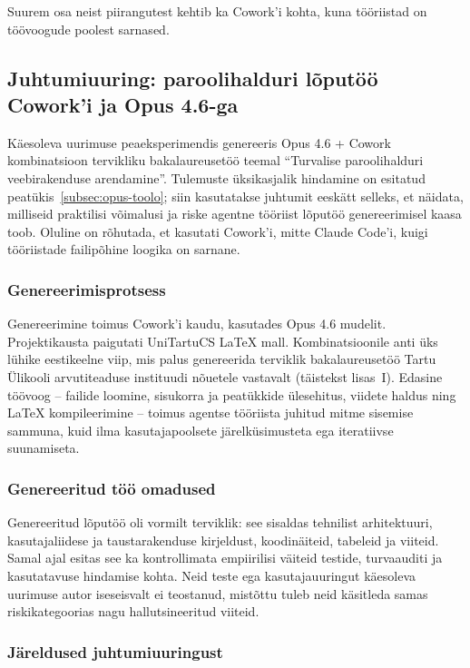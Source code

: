 Suurem osa neist piirangutest kehtib ka Cowork'i kohta, kuna tööriistad on töövoogude poolest sarnased.

\subsection{Juhtumiuuring: paroolihalduri lõputöö Cowork'i ja Opus 4.6-ga} \label{subsec:cowork-juhtumiuuring}

Käesoleva uurimuse peaeksperimendis genereeris Opus 4.6 + Cowork kombinatsioon tervikliku bakalaureusetöö teemal ``Turvalise paroolihalduri veebirakenduse arendamine''. Tulemuste üksikasjalik hindamine on esitatud peatükis~\ref{subsec:opus-toolo}; siin kasutatakse juhtumit eeskätt selleks, et näidata, milliseid praktilisi võimalusi ja riske agentne tööriist lõputöö genereerimisel kaasa toob. Oluline on rõhutada, et kasutati Cowork'i, mitte Claude Code'i, kuigi tööriistade failipõhine loogika on sarnane.

\subsubsection{Genereerimisprotsess}

Genereerimine toimus Cowork'i kaudu, kasutades Opus 4.6 mudelit. Projektikausta paigutati UniTartuCS \LaTeX{} mall. Kombinatsioonile anti üks lühike eestikeelne viip, mis palus genereerida terviklik bakalaureusetöö Tartu Ülikooli arvutiteaduse instituudi nõuetele vastavalt (täistekst lisas~I). Edasine töövoog -- failide loomine, sisukorra ja peatükkide ülesehitus, viidete haldus ning \LaTeX{} kompileerimine -- toimus agentse tööriista juhitud mitme sisemise sammuna, kuid ilma kasutajapoolsete järelküsimusteta ega iteratiivse suunamiseta.

\subsubsection{Genereeritud töö omadused}

Genereeritud lõputöö oli vormilt terviklik: see sisaldas tehnilist arhitektuuri, kasutajaliidese ja taustarakenduse kirjeldust, koodinäiteid, tabeleid ja viiteid. Samal ajal esitas see ka kontrollimata empiirilisi väiteid testide, turvaauditi ja kasutatavuse hindamise kohta. Neid teste ega kasutajauuringut käesoleva uurimuse autor iseseisvalt ei teostanud, mistõttu tuleb neid käsitleda samas riskikategoorias nagu hallutsineeritud viiteid.

\subsubsection{Järeldused juhtumiuuringust}

